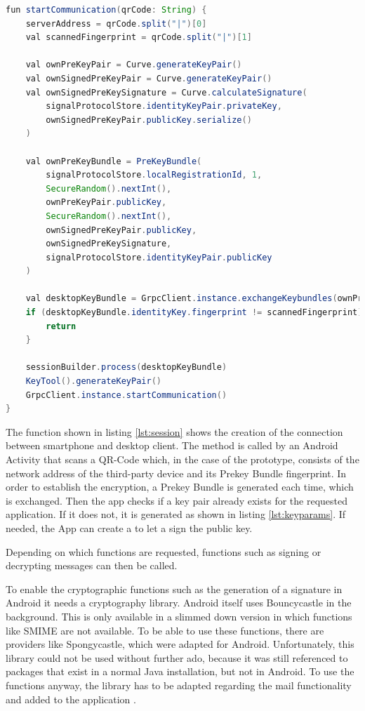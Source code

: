 \documentclass[12pt,oneside,a4paper,parskip]{scrbook}
\begin{document}
\begin{lstlisting}[label=lst:session,
				   language=java,
				   firstnumber=1,
				   caption=Creating a Session]
fun startCommunication(qrCode: String) {
    serverAddress = qrCode.split("|")[0]
    val scannedFingerprint = qrCode.split("|")[1]

    val ownPreKeyPair = Curve.generateKeyPair()
    val ownSignedPreKeyPair = Curve.generateKeyPair()
    val ownSignedPreKeySignature = Curve.calculateSignature(
        signalProtocolStore.identityKeyPair.privateKey,
        ownSignedPreKeyPair.publicKey.serialize()
    )

    val ownPreKeyBundle = PreKeyBundle(
        signalProtocolStore.localRegistrationId, 1,
        SecureRandom().nextInt(),
        ownPreKeyPair.publicKey,
        SecureRandom().nextInt(),
        ownSignedPreKeyPair.publicKey,
        ownSignedPreKeySignature,
        signalProtocolStore.identityKeyPair.publicKey
    )

    val desktopKeyBundle = GrpcClient.instance.exchangeKeybundles(ownPreKeyBundle)
    if (desktopKeyBundle.identityKey.fingerprint != scannedFingerprint) {
        return
    }

    sessionBuilder.process(desktopKeyBundle)
    KeyTool().generateKeyPair()
    GrpcClient.instance.startCommunication()
}
\end{lstlisting}

The function shown in listing \ref{lst:session} shows the creation of the connection between smartphone and desktop client. The method is called by an Android Activity that scans a QR-Code which, in the case of the prototype, consists of the network address of the third-party device and its Prekey Bundle fingerprint. In order to establish the encryption, a Prekey Bundle is generated each time, which is exchanged. Then the app checks if a key pair already exists for the requested application. If it does not, it is generated as shown in listing \ref{lst:keyparams}. If needed, the App can create a  to let a  sign the public key.

Depending on which functions are requested, functions such as signing or decrypting messages can then be called. 

To enable the cryptographic functions such as the generation of a signature in Android it needs a cryptography library. Android itself uses Bouncycastle in the background. This is only available in a slimmed down version in which functions like SMIME are not available. To be able to use these functions, there are providers like Spongycastle, which were adapted for Android. Unfortunately, this library could not be used without further ado, because it was still referenced to packages that exist in a normal Java installation, but not in Android. To use the functions anyway, the library has to be adapted regarding the mail functionality and added to the application \parencite{noauthor_bouncycastle_nodate}.
\end{document}
